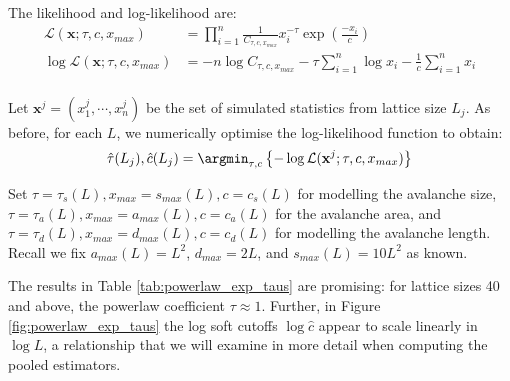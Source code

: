 The likelihood and log-likelihood are:
\begin{align*}
    \mathcal{L}(\mathbf{x}; \tau, c, x_{max}) &= \prod_{i=1}^n \frac{1}{C_{\tau, c, x_{max}}} x_i^{-\tau} \exp\left( \frac{-x_i}{c} \right) \\
    \log \mathcal{L}(\mathbf{x}; \tau, c, x_{max}) &= -n \log C_{\tau, c, x_{max}} -\tau \sum_{i=1}^n \log x_i - \frac{1}{c}\sum_{i=1}^n x_i \\
\end{align*}

Let $\mathbf{x}^j = (x_1^j, \cdots, x_n^j)$ be the set of simulated statistics from lattice size $L_j$. As before, for each $L$, we numerically optimise the log-likelihood function to obtain:
\[\hat{\tau}(L_j), \hat{c}(L_j) = \argmin_{\tau, c}\left\{ -\log \mathcal{L}(\mathbf{x}^j; \tau, c, x_{max}) \right\}\]

Set $\tau = \tau_s(L), x_{max} = s_{max}(L), c = c_s(L)$ for modelling the avalanche size, $\tau = \tau_a(L), x_{max} = a_{max}(L), c = c_a(L)$ for the avalanche area, and $\tau = \tau_d(L), x_{max} = d_{max}(L), c = c_d(L)$ for modelling the avalanche length.
Recall we fix $a_{max}(L) = L^2$, $d_{max}=2L$, and $s_{max}(L) = 10L^2$ as known.

The results in Table \ref{tab:powerlaw_exp_taus} are promising: for lattice sizes 40 and above, the powerlaw coefficient $\tau \approx 1$.
Further, in Figure \ref{fig:powerlaw_exp_taus} the log soft cutoffs $\log \hat{c}$ appear to scale linearly in $\log L$, a relationship that we will examine in more detail when computing the pooled estimators.


